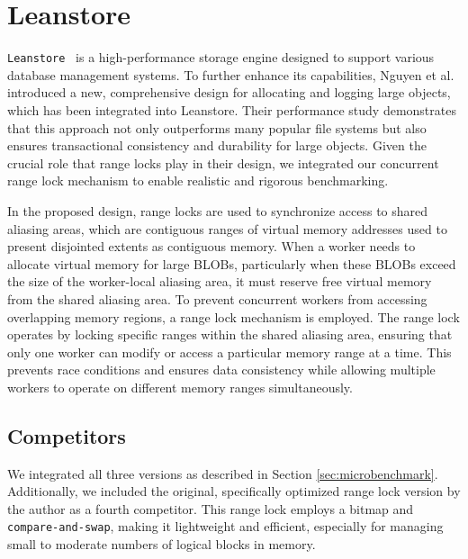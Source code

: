 \newpage

\section{Leanstore}\label{sec:leanstore}

\texttt{Leanstore}~\parencite{leis2018leanstore} is a high-performance storage engine designed to support various database management systems. To further enhance its capabilities, Nguyen et al.~\parencite{nguyen2024files} introduced a new, comprehensive design for allocating and logging large objects, which has been integrated into Leanstore. Their performance study demonstrates that this approach not only outperforms many popular file systems but also ensures transactional consistency and durability for large objects. Given the crucial role that range locks play in their design, we integrated our concurrent range lock mechanism to enable realistic and rigorous benchmarking.

In the proposed design, range locks are used to synchronize access to shared aliasing areas, which are contiguous ranges of virtual memory addresses used to present disjointed extents as contiguous memory. When a worker needs to allocate virtual memory for large BLOBs, particularly when these BLOBs exceed the size of the worker-local aliasing area, it must reserve free virtual memory from the shared aliasing area. To prevent concurrent workers from accessing overlapping memory regions, a range lock mechanism is employed. The range lock operates by locking specific ranges within the shared aliasing area, ensuring that only one worker can modify or access a particular memory range at a time. This prevents race conditions and ensures data consistency while allowing multiple workers to operate on different memory ranges simultaneously. 

\subsection{Competitors}

We integrated all three versions as described in Section \ref{sec:microbenchmark}. Additionally, we included the original, specifically optimized range lock version by the author as a fourth competitor. This range lock employs a bitmap and \texttt{compare-and-swap}, making it lightweight and efficient, especially for managing small to moderate numbers of logical blocks in memory.

